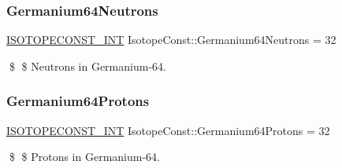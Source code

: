 \subsubsection{\texorpdfstring{Germanium64\+Neutrons}{Germanium64Neutrons}}
{\footnotesize\ttfamily \mbox{\hyperlink{group___isotope_const-_macros_ga5f18360b3e99483a35c32d789e62621c}{I\+S\+O\+T\+O\+P\+E\+C\+O\+N\+S\+T\+\_\+\+I\+NT}} Isotope\+Const\+::\+Germanium64\+Neutrons = 32}

\$ \$ Neutrons in Germanium-\/64. \mbox{\label{group___isotope_const-_germanium-_ge64_gacf3b5bdffe14a9358564f6cd99f77b60}} 
\subsubsection{\texorpdfstring{Germanium64\+Protons}{Germanium64Protons}}
{\footnotesize\ttfamily \mbox{\hyperlink{group___isotope_const-_macros_ga5f18360b3e99483a35c32d789e62621c}{I\+S\+O\+T\+O\+P\+E\+C\+O\+N\+S\+T\+\_\+\+I\+NT}} Isotope\+Const\+::\+Germanium64\+Protons = 32}

\$ \$ Protons in Germanium-\/64. 
